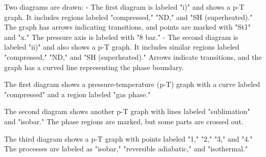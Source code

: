 Two diagrams are drawn:  
- The first diagram is labeled "i)" and shows a p-T graph. It includes regions labeled "compressed," "ND," and "SH (superheated)." The graph has arrows indicating transitions, and points are marked with "St1" and "x." The pressure axis is labeled with "8 bar."  
- The second diagram is labeled "ii)" and also shows a p-T graph. It includes similar regions labeled "compressed," "ND," and "SH (superheated)." Arrows indicate transitions, and the graph has a curved line representing the phase boundary.

The first diagram shows a pressure-temperature (p-T) graph with a curve labeled "compressed" and a region labeled "gas phase."  

The second diagram shows another p-T graph with lines labeled "sublimation" and "isobar." The phase regions are marked, but some parts are crossed out.  

The third diagram shows a p-T graph with points labeled "1," "2," "3," and "4." The processes are labeled as "isobar," "reversible adiabatic," and "isothermal."